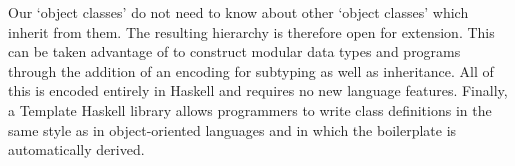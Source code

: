 Our `object classes' do not need to know about other `object classes' which inherit from them. The resulting hierarchy is therefore open for extension. This can be taken advantage of to construct modular data types and programs through the addition of an encoding for subtyping as well as inheritance. All of this is encoded entirely in Haskell and requires no new language features. Finally, a Template Haskell library allows programmers to write class definitions in the same style as in object-oriented languages and in which the boilerplate is automatically derived.




